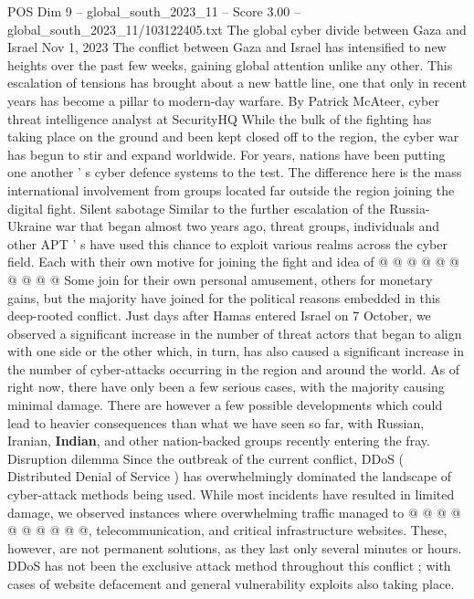 \begin{textsample}{POS Dim 9 – global\_south\_2023\_11 – Score 3.00 – global\_south\_2023\_11/103122405.txt}  \label{ex:f9_pos_127}
The global cyber divide between Gaza and Israel Nov 1, 2023 The conflict between Gaza and Israel has intensified to new heights over the past few weeks, gaining global attention unlike any other.
This escalation of tensions has brought about a new battle line, one that only in recent years has become a pillar to modern-day warfare.
By Patrick McAteer, cyber threat intelligence analyst at SecurityHQ While the bulk of the fighting has taking place on the ground and been kept closed off to the region, the cyber war has begun to stir and expand worldwide.
For years, nations have been putting one another ' s cyber defence systems to the test.
The difference here is the mass international involvement from groups located far outside the region joining the digital fight.
Silent sabotage Similar to the further escalation of the Russia-Ukraine war that began almost two years ago, threat groups, individuals and other APT ' s have used this chance to exploit various realms across the cyber field.
Each with their own motive for joining the fight and idea of @ @ @ @ @ @ @ @ @ @ Some join for their own personal amusement, others for monetary gains, but the majority have joined for the political reasons embedded in this deep-rooted conflict.
Just days after Hamas entered Israel on 7 October, we observed a significant increase in the number of threat actors that began to align with one side or the other which, in turn, has also caused a significant increase in the number of cyber-attacks occurring in the region and around the world.
As of right now, there have only been a few serious cases, with the majority causing minimal damage.
There are however a few possible developments which could lead to heavier consequences than what we have seen so far, with Russian, Iranian, \textbf{Indian}, and other nation-backed groups recently entering the fray.
Disruption dilemma Since the outbreak of the current conflict, DDoS ( Distributed Denial of Service ) has overwhelmingly dominated the landscape of cyber-attack methods being used.
While most incidents have resulted in limited damage, we observed instances where overwhelming traffic managed to @ @ @ @ @ @ @ @ @ @, telecommunication, and critical infrastructure websites.
These, however, are not permanent solutions, as they last only several minutes or hours.
DDoS has not been the exclusive attack method throughout this conflict ; with cases of website defacement and general vulnerability exploits also taking place.

\end{textsample}
